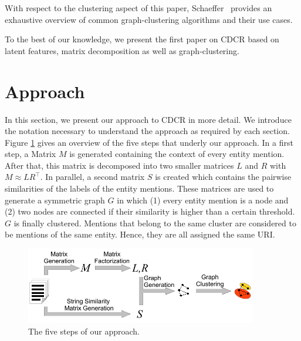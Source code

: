 \documentclass{llncs}
\begin{document}
With respect to the clustering aspect of this paper, Schaeffer~\cite{schaeffer2007graph} provides an exhaustive overview of common graph-clustering algorithms and their use cases.

To the best of our knowledge, we present the first paper on CDCR based on latent features, matrix decomposition as well as graph-clustering.


\section{Approach}
In this section, we present our approach to CDCR in more detail. 
We introduce the notation necessary to understand the approach as required by each section.
Figure \ref{fig:SystemOverview} gives an overview of the five steps that underly our approach.
In a first step, a Matrix $M$ is generated containing the context of every entity mention.
After that, this matrix is decomposed into two smaller matrices $L$ and $R$ with $M \approx LR^{\top}$.
In parallel, a second matrix $S$ is created which contains the pairwise similarities of the labels of the entity mentions.
These matrices are used to generate a symmetric graph $G$ in which (1) every entity mention is a node and (2) two nodes are connected if their similarity is higher than a certain threshold.
$G$ is finally clustered.
Mentions that belong to the same cluster are considered to be mentions of the same entity.
Hence, they are all assigned the same URI.

\begin{figure}
\centering
\includegraphics[width=0.9\textwidth]{SystemOverview.pdf}
\caption{The five steps of our approach.}
\label{fig:SystemOverview}
\end{figure}

\end{document}
